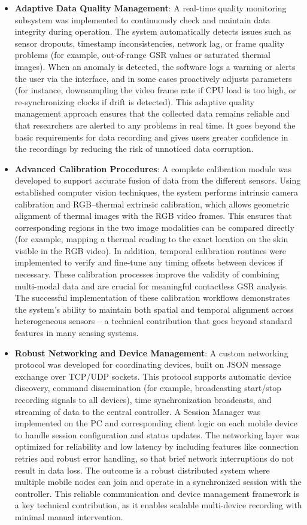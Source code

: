 \begin{itemize}
\item \textbf{Adaptive Data Quality Management}: A real-time quality monitoring subsystem was implemented to continuously check and maintain data integrity during operation. The system automatically detects issues such as sensor dropouts, timestamp inconsistencies, network lag, or frame quality problems (for example, out-of-range GSR values or saturated thermal images). When an anomaly is detected, the software logs a warning or alerts the user via the interface, and in some cases proactively adjusts parameters (for instance, downsampling the video frame rate if CPU load is too high, or re-synchronizing clocks if drift is detected). This adaptive quality management approach ensures that the collected data remains reliable and that researchers are alerted to any problems in real time. It goes beyond the basic requirements for data recording and gives users greater confidence in the recordings by reducing the risk of unnoticed data corruption.

\item \textbf{Advanced Calibration Procedures}: A complete calibration module was developed to support accurate fusion of data from the different sensors. Using established computer vision techniques, the system performs intrinsic camera calibration and RGB--thermal extrinsic calibration, which allows geometric alignment of thermal images with the RGB video frames. This ensures that corresponding regions in the two image modalities can be compared directly (for example, mapping a thermal reading to the exact location on the skin visible in the RGB video). In addition, temporal calibration routines were implemented to verify and fine-tune any timing offsets between devices if necessary. These calibration processes improve the validity of combining multi-modal data and are crucial for meaningful contactless GSR analysis. The successful implementation of these calibration workflows demonstrates the system's ability to maintain both spatial and temporal alignment across heterogeneous sensors -- a technical contribution that goes beyond standard features in many sensing systems.

\item \textbf{Robust Networking and Device Management}: A custom networking protocol was developed for coordinating devices, built on JSON message exchange over TCP/UDP sockets. This protocol supports automatic device discovery, command dissemination (for example, broadcasting start/stop recording signals to all devices), time synchronization broadcasts, and streaming of data to the central controller. A Session Manager was implemented on the PC and corresponding client logic on each mobile device to handle session configuration and status updates. The networking layer was optimized for reliability and low latency by including features like connection retries and robust error handling, so that brief network interruptions do not result in data loss. The outcome is a robust distributed system where multiple mobile nodes can join and operate in a synchronized session with the controller. This reliable communication and device management framework is a key technical contribution, as it enables scalable multi-device recording with minimal manual intervention.


\end{itemize}
